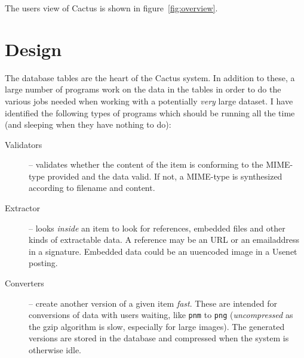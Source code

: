 The users view of Cactus is shown in
figure~\vref{fig:overview}.

\section{Design}
\label{sec:cactus-design}

The database tables are the heart of the Cactus system.  In
addition to these, a large number of programs work on the
data in the tables in order to do the various jobs needed
when working with a potentially \textit{very} large dataset.
I have identified the following types of programs which
should be running all the time (and sleeping when they have
nothing to do):

\begin{description}
  
\item[Validators] -- validates whether the content
  of the item is conforming to the MIME-type provided and
  the data valid.  If not, a MIME-type is synthesized
  according to filename and content.

  

  
\item[Extractor] -- looks \textit{inside} an item to look
  for references, embedded files and other kinds of
  extractable data.  A reference may be an URL or an
  emailaddress in a signature.  Embedded data could be an
  uuencoded image in a Usenet posting.
  
\item[Converters] -- create another version of a given item
  \textit{fast}.  These are intended for conversions of data
  with users waiting, like \texttt{pnm} to
  \texttt{png} (\textit{uncompressed} as the gzip algorithm is slow,
  especially for large images).  The generated
  versions are stored in the database and compressed when
  the system is otherwise idle.

  

\end{description}
